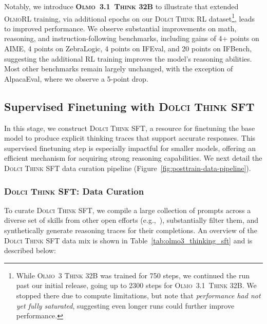\documentclass[table]{ai2style/ai2}
\newcommand{\newOlmo}{Olmo\xspace}
\newcommand{\olmothreerl}{\textsc{\newOlmo{}RL}\xspace}
\newcommand{\olmothreeonethink}{\textsc{\newOlmo~3.1~Think}\xspace}
\newcommand{\olmothreethinking}{\textsc{Olmo~3 Think}\xspace}
\newcommand{\dolcithinksft}{\textsc{Dolci Think SFT}\xspace}
\newcommand{\dolcithinkrl}{\textsc{Dolci Think RL}\xspace}
\begin{document}
Notably, we introduce {\bf \olmothreeonethink 32B} to illustrate that extended \olmothreerl training, via additional epochs on our \dolcithinkrl dataset\footnote{While \olmothreethinking 32B was trained for 750 steps, we continued the run past our initial release, going up to 2300 steps for \olmothreeonethink 32B. We stopped there due to compute limitations, but note that \textit{performance had not yet fully saturated}, suggesting even longer runs could further improve performance.}, leads to improved performance. We observe substantial improvements on math, reasoning, and instruction-following benchmarks, including gains of 4+ points on AIME, 4 points on ZebraLogic, 4 points on IFEval, and 20 points on IFBench, suggesting the additional RL training improves the model's reasoning abilities. Most other benchmarks remain largely unchanged, with the exception of AlpacaEval, where we observe a 5-point drop.

\subsection{Supervised Finetuning with \dolcithinksft }
\label{sec:thinking_sft_recipe}

In this stage, we construct \dolcithinksft, a resource for finetuning the base model to produce explicit thinking traces that support accurate responses. This supervised finetuning step is especially impactful for smaller models, offering an efficient mechanism for acquiring strong reasoning capabilities. We next detail the \dolcithinksft data curation pipeline (Figure~\ref{fig:posttrain-data-pipeline}).

\subsubsection{\dolcithinksft: Data Curation}
\label{sec:think-sft}

To curate \dolcithinksft, we compile a large collection of prompts across a diverse set of skills from other open efforts (e.g.,~\citealp{guha2025openthoughts, primeintellect2025synthetic2}), substantially filter them, and synthetically generate reasoning traces for their completions.
An overview of the \dolcithinksft data mix is shown in Table~\ref{tab:olmo3_thinking_sft} and is described below:
\end{document}
